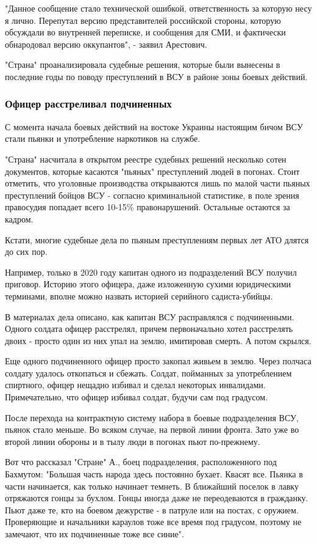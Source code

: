 "Данное сообщение стало технической ошибкой, ответственность за которую несу я
лично. Перепутал версию представителей российской стороны, которую обсуждали во
внутренней переписке, и сообщения для СМИ, и фактически обнародовал версию
оккупантов", - заявил Арестович. 

"Страна" проанализировала судебные решения, которые были вынесены в последние
годы по поводу преступлений в ВСУ в районе зоны боевых действий. 

\subsubsection{Офицер расстреливал подчиненных }

С момента начала боевых действий на востоке Украины настоящим бичом ВСУ стали
пьянки и употребление наркотиков на службе.

"Страна" насчитала в открытом реестре судебных решений несколько сотен
документов, которые касаются "пьяных" преступлений людей в погонах. Стоит
отметить, что уголовные производства открываются лишь по малой части пьяных
преступлений бойцов ВСУ - согласно криминальной статистике, в поле зрения
правосудия попадает всего 10-15\% правонарушений. Остальные остаются за кадром.

Кстати, многие судебные дела по пьяным преступлениям первых лет АТО длятся до
сих пор.

Например, только в 2020 году капитан одного из подразделений ВСУ получил
приговор. Историю этого офицера, даже изложенную сухими юридическими терминами,
вполне можно назвать историей серийного садиста-убийцы. 

В материалах дела описано, как капитан ВСУ расправлялся с подчиненными. Одного
солдата офицер расстрелял, причем первоначально хотел расстрелять двоих -
просто один из них упал на землю, имитировав смерть. А потом скрылся.

Еще одного подчиненного офицер просто закопал живьем в землю. Через полчаса
солдату удалось откопаться и сбежать. Солдат, пойманных за употреблением
спиртного, офицер нещадно избивал и сделал некоторых инвалидами. Примечательно,
что офицер избивал солдат, будучи сам под градусом.

После перехода на контрактную систему набора в боевые подразделения ВСУ, пьянок
стало меньше. Во всяком случае, на первой линии фронта. Зато уже во второй
линии обороны и в тылу люди в погонах пьют по-прежнему.

Вот что рассказал "Стране" А., боец подразделения, расположенного под Бахмутом:
"Большая часть народа здесь постоянно бухает. Квасят все. Пьянка в части
начинается, как только начинает темнеть. В ближайший поселок в лавку отряжаются
гонцы за бухлом. Гонцы иногда даже не переодеваются в гражданку. Пьют даже те,
кто на боевом дежурстве - в патруле или на постах, с оружием. Проверяющие и
начальники караулов тоже все время под градусом, поэтому не замечают, что их
подчиненные тоже все синие".


